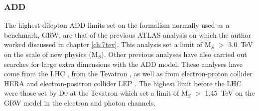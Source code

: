     \subsubsection*{ADD}
        The highest dilepton ADD limits set on the formalism normally used as a benchmark, GRW, are that of the previous ATLAS analysis on which the author worked \cite{PhysRevD.87.015010} discussed in chapter \ref{ch:7tev}. This analysis set a limit of M$_{S}$ $>$ 3.0~TeV on the scale of new physics (M$_{S}$). Other previous analyses have also carried out searches for large extra dimensions with the ADD model. These analyses have come from the LHC \cite{PhysRevD.87.015010,ATLAS:2011ab,Chatrchyan201215,PhysRevLett.108.111801}, from the Tevatron \cite{Abazov:2008as,PhysRevLett.95.161602,PhysRevLett.103.191803}, as well as from electron-proton collider HERA \cite{Adloff2000358,Chekanov200423} and electron-positron collider LEP \cite{Acciarri1999281,Acciarri1999135,Abreu200045,Abreu200067,Abbiendi2003331,Abbiendi2000553}. The highest limit before the LHC were those set by D0 at the Tevatron \cite{Abazov:2008as} which set a limit of M$_{S}$ $>$ 1.45~TeV on the GRW model in the electron and photon channels. 








